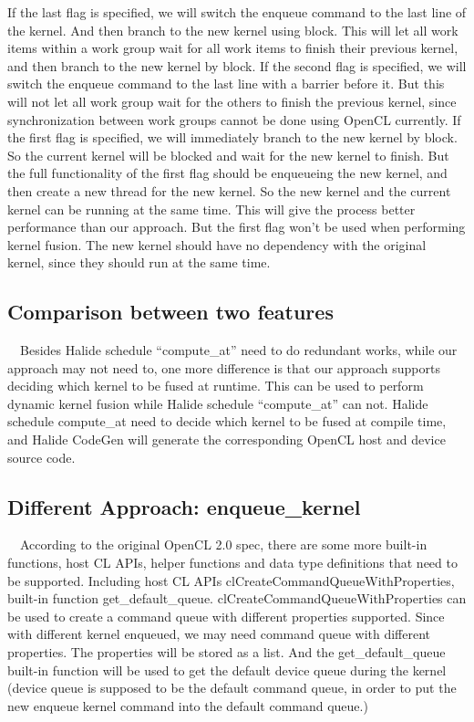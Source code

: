 \documentclass{sigplanconf}
\begin{document}
	If the last flag is specified, we will switch the enqueue command to the last line of the kernel. And then branch to the new kernel using block. This will let all work items within a work group wait for all work items to finish their previous kernel, and then branch to the new kernel by block.
	If the second flag is specified, we will switch the enqueue command to the last line with a barrier before it. But this will not let all work group wait for the others to finish the previous kernel, since synchronization between work groups cannot be done using OpenCL currently.
	If the first flag is specified, we will immediately branch to the new kernel by block. So the current kernel will be blocked and wait for the new kernel to finish. But the full functionality of the first flag should be enqueueing the new kernel, and then create a new thread for the new kernel. So the new kernel and the current kernel can be running at the same time. This will give the process better performance than our approach. But the first flag won’t be used when performing kernel fusion. The new kernel should have no dependency with the original kernel, since they should run at the same time.
	
\subsection{Comparison between two features}
\quad\ \ Besides Halide schedule “compute\_at” need to do redundant works, while our approach may not need to, one more difference is that our approach supports deciding which kernel to be fused at runtime. This can be used to perform dynamic kernel fusion while Halide schedule “compute\_at” can not. Halide schedule compute\_at need to decide which kernel to be fused at compile time, and Halide CodeGen will generate the corresponding OpenCL host and device source code.

\subsection{Different Approach: enqueue\_kernel}
\quad\ \ According to the original OpenCL 2.0 spec, there are some more built-in functions, host CL APIs, helper functions and data type definitions that need to be supported. Including host CL APIs clCreateCommandQueueWithProperties, built-in function get\_default\_queue. 
	clCreateCommandQueueWithProperties can be used to create a command queue with different properties supported. Since with different kernel enqueued, we may need command queue with different properties. The properties will be stored as a list. And the get\_default\_queue built-in function will be used to get the default device queue during the kernel (device queue is supposed to be the default command queue, in order to put the new enqueue kernel command into the default command queue.) 
	
\end{document}
